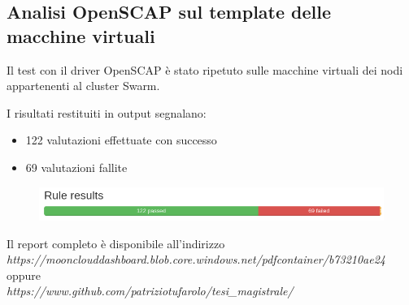 \documentclass[../main.tex]{subfiles}
\begin{document}
\subsection{Analisi OpenSCAP sul template delle macchine virtuali}
Il test con il driver OpenSCAP è stato ripetuto sulle macchine virtuali dei nodi appartenenti al cluster Swarm.

I risultati restituiti in output segnalano:
\begin{itemize}
    \item 122 valutazioni effettuate con successo
    \item 69 valutazioni fallite
\end{itemize}
\begin{figure}[H]
    \centering
    \includegraphics[width=15cm]{immagini/test_oscap_2.png}
\end{figure}

Il report completo è disponibile all'indirizzo \\
\textit{https://moonclouddashboard.blob.core.windows.net/pdfcontainer/b73210ae24}    \\   
oppure \\
\textit{https://www.github.com/patriziotufarolo/tesi\_magistrale/} \\

\end{document}
